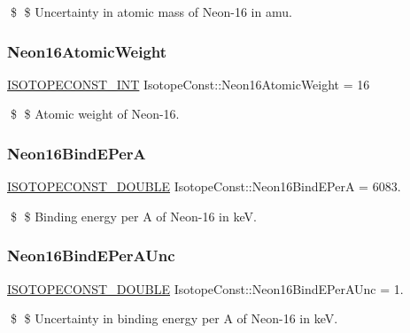 \$ \$ Uncertainty in atomic mass of Neon-\/16 in amu. \mbox{\label{group___isotope_const-_neon-_ne16_gad0fce6a459818aac661bdc1f51863665}} 
\subsubsection{\texorpdfstring{Neon16\+Atomic\+Weight}{Neon16AtomicWeight}}
{\footnotesize\ttfamily \mbox{\hyperlink{group___isotope_const-_macros_ga5f18360b3e99483a35c32d789e62621c}{I\+S\+O\+T\+O\+P\+E\+C\+O\+N\+S\+T\+\_\+\+I\+NT}} Isotope\+Const\+::\+Neon16\+Atomic\+Weight = 16}

\$ \$ Atomic weight of Neon-\/16. \mbox{\label{group___isotope_const-_neon-_ne16_ga017ccd9a6d93ad7497bc5c9da6c84f32}} 
\subsubsection{\texorpdfstring{Neon16\+Bind\+E\+PerA}{Neon16BindEPerA}}
{\footnotesize\ttfamily \mbox{\hyperlink{group___isotope_const-_macros_ga8f45a7272ce02c0b4c65c44636ed719a}{I\+S\+O\+T\+O\+P\+E\+C\+O\+N\+S\+T\+\_\+\+D\+O\+U\+B\+LE}} Isotope\+Const\+::\+Neon16\+Bind\+E\+PerA = 6083.}

\$ \$ Binding energy per A of Neon-\/16 in keV. \mbox{\label{group___isotope_const-_neon-_ne16_ga067cfcfb6d5772896b6d82354438a9aa}} 
\subsubsection{\texorpdfstring{Neon16\+Bind\+E\+Per\+A\+Unc}{Neon16BindEPerAUnc}}
{\footnotesize\ttfamily \mbox{\hyperlink{group___isotope_const-_macros_ga8f45a7272ce02c0b4c65c44636ed719a}{I\+S\+O\+T\+O\+P\+E\+C\+O\+N\+S\+T\+\_\+\+D\+O\+U\+B\+LE}} Isotope\+Const\+::\+Neon16\+Bind\+E\+Per\+A\+Unc = 1.}

\$ \$ Uncertainty in binding energy per A of Neon-\/16 in keV. \mbox{\label{group___isotope_const-_neon-_ne16_gaf8bf74eee2c31eedbbbeab10eb8e6927}} 

